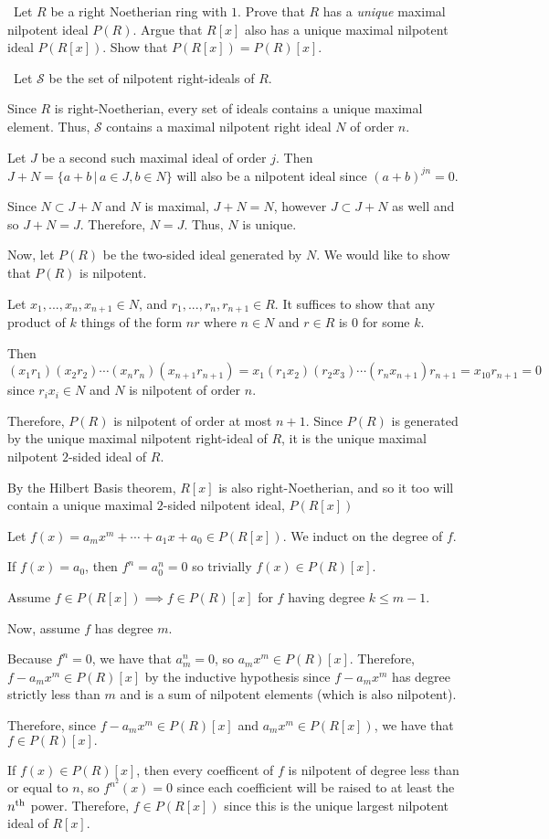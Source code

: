 \documentclass[12pt]{AlgebraQual}
\begin{document}
\begin{problem} $\,$
Let $R$ be a right Noetherian ring with $1.$ Prove that $R$ has a \textit{unique} maximal nilpotent ideal $P(R)$. Argue that $R[x]$ also has a unique maximal nilpotent ideal $P(R[x])$. Show that $P(R[x])=P(R)[x].$
\end{problem}


\begin{solution}$\,$
Let $\mathscr{S}$ be the set of nilpotent right-ideals of $R$.

Since $R$ is right-Noetherian, every set of ideals contains a unique maximal element. Thus, $\mathscr{S}$ contains a maximal nilpotent right ideal $N$ of order $n.$

Let $J$ be a second such maximal ideal of order $j$. Then $J+N=\{a+b\,|\,a\in J, b\in N\}$ will also be a nilpotent ideal since $(a+b)^{jn}=0$.

Since $N\subset J+N$ and $N$ is maximal, $J+N=N$, however $J\subset J+N$ as well and so $J+N=J.$ Therefore, $N=J.$ Thus, $N$ is unique.

Now, let $P(R)$ be the two-sided ideal generated by $N.$ We would like to show that $P(R)$ is nilpotent.

Let $x_1,...,x_n,x_{n+1}\in N$, and $r_1,...,r_n,r_{n+1}\in R$. It suffices to show that any product of $k$ things of the form $nr$ where $n\in N$ and $r\in R$ is $0$ for some $k.$

Then $$(x_1r_1)(x_2r_2)\cdots(x_nr_n)(x_{n+1}r_{n+1})=x_1(r_1x_2)(r_2x_3)\cdots(r_nx_{n+1})r_{n+1}=x_10r_{n+1}=0$$ since $r_ix_i\in N$ and $N$ is nilpotent of order $n.$

Therefore, $P(R)$ is nilpotent of order at most $n+1.$ Since $P(R)$ is generated by the unique maximal nilpotent right-ideal of $R$, it is the unique maximal nilpotent $2$-sided ideal of $R.$

By the Hilbert Basis theorem, $R[x]$ is also right-Noetherian, and so it too will contain a unique maximal $2$-sided nilpotent ideal, $P(R[x])$

Let $f(x)=a_mx^m+\cdots+a_1x+a_0\in P(R[x]).$ We induct on the degree of $f.$

If $f(x)=a_0$, then $f^n=a_0^n=0$ so trivially $f(x)\in P(R)[x].$

Assume $f\in P(R[x])\implies f\in P(R)[x]$ for $f$ having degree $k\le m-1$.

Now, assume $f$ has degree $m$.

Because $f^n=0$, we have that $a_m^n=0$, so $a_mx^m\in P(R)[x]$. Therefore, $f-a_mx^m\in P(R)[x]$ by the inductive hypothesis since $f-a_mx^m$ has degree strictly less than $m$ and is a sum of nilpotent elements (which is also nilpotent).

Therefore, since $f-a_mx^m\in P(R)[x]$ and $a_mx^m\in P(R[x])$, we have that $f\in P(R)[x].$

If $f(x)\in P(R)[x]$, then every coefficent of $f$ is nilpotent of degree less than or equal to $n$, so $f^{n^2}(x)=0$ since each coefficient will be raised to at least the $n^\text{th}$ power. Therefore, $f\in P(R[x])$ since this is the unique largest nilpotent ideal of $R[x].$

\end{solution}
\newpage
\end{document}
